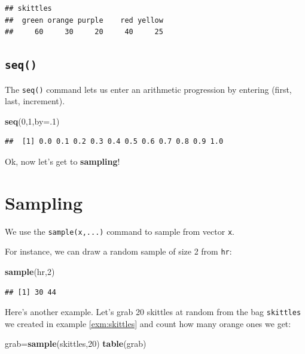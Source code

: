 \documentclass[
]{book}
\newenvironment{Shaded}{\begin{snugshade}}{\end{snugshade}}
\newcommand{\AttributeTok}[1]{\textcolor[rgb]{0.13,0.29,0.53}{#1}}
\newcommand{\DecValTok}[1]{\textcolor[rgb]{0.00,0.00,0.81}{#1}}
\newcommand{\FunctionTok}[1]{\textcolor[rgb]{0.13,0.29,0.53}{\textbf{#1}}}
\newcommand{\NormalTok}[1]{#1}
\newcommand{\OtherTok}[1]{\textcolor[rgb]{0.56,0.35,0.01}{#1}}
\theoremstyle{definition}
\theoremstyle{definition}
\theoremstyle{definition}
\theoremstyle{definition}
\theoremstyle{remark}
\begin{document}
\begin{verbatim}
## skittles
##  green orange purple    red yellow 
##     60     30     20     40     25
\end{verbatim}

\subsection*{\texorpdfstring{\texttt{seq()}}{seq()}}\label{seq}

The \texttt{seq()} command lets us enter an arithmetic progression by entering (first, last, increment).

\begin{Shaded}
\begin{Highlighting}[]
\FunctionTok{seq}\NormalTok{(}\DecValTok{0}\NormalTok{,}\DecValTok{1}\NormalTok{,}\AttributeTok{by=}\NormalTok{.}\DecValTok{1}\NormalTok{)}
\end{Highlighting}
\end{Shaded}

\begin{verbatim}
##  [1] 0.0 0.1 0.2 0.3 0.4 0.5 0.6 0.7 0.8 0.9 1.0
\end{verbatim}

Ok, now let's get to \textbf{sampling}!

\section{Sampling}\label{sampling-in-R}

We use the \texttt{sample(x,...)} command to sample from vector \texttt{x}.

For instance, we can draw a random sample of size 2 from \texttt{hr}:

\begin{Shaded}
\begin{Highlighting}[]
\FunctionTok{sample}\NormalTok{(hr,}\DecValTok{2}\NormalTok{)}
\end{Highlighting}
\end{Shaded}

\begin{verbatim}
## [1] 30 44
\end{verbatim}

Here's another example. Let's grab 20 skittles at random from the bag \texttt{skittles} we created in example \ref{exm:skittles} and count how many orange ones we get:

\begin{Shaded}
\begin{Highlighting}[]
\NormalTok{grab}\OtherTok{=}\FunctionTok{sample}\NormalTok{(skittles,}\DecValTok{20}\NormalTok{)}
\FunctionTok{table}\NormalTok{(grab)}
\end{Highlighting}
\end{Shaded}
\end{document}
